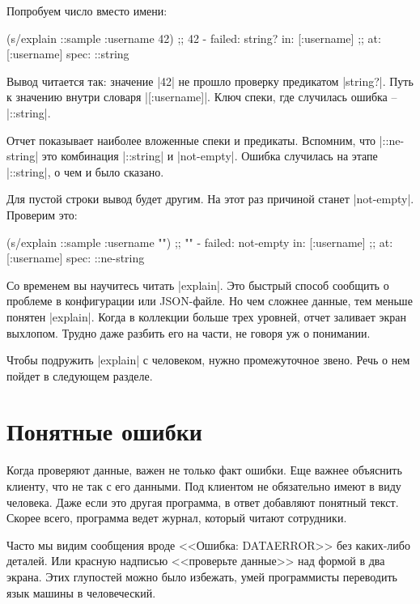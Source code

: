 Попробуем число вместо имени:

\begin{english}
  \begin{clojure}
(s/explain ::sample {:username 42})
;; 42 - failed: string? in: [:username]
;; at: [:username] spec: ::string
  \end{clojure}
\end{english}

Вывод читается так: значение \spverb|42| не прошло проверку предикатом
\spverb|string?|. Путь к значению внутри словаря \spverb|[:username]|. Ключ
спеки, где случилась ошибка -- \spverb|::string|.

Отчет показывает наиболее вложенные спеки и предикаты. Вспомним, что
\spverb|::ne-string| это комбинация \spverb|::string| и
\spverb|not-empty|. Ошибка случилась на этапе \spverb|::string|, о чем и было
сказано.

Для пустой строки вывод будет другим. На этот раз причиной станет
\spverb|not-empty|. Проверим это:

\begin{english}
  \begin{clojure}
(s/explain ::sample {:username ""})
;; "" - failed: not-empty in: [:username]
;; at: [:username] spec: ::ne-string
  \end{clojure}
\end{english}

Со временем вы научитесь читать \spverb|explain|. Это быстрый способ сообщить о
проблеме в конфигурации или JSON-файле. Но чем сложнее данные, тем меньше
понятен \spverb|explain|. Когда в коллекции больше трех уровней, отчет заливает
экран выхлопом. Трудно даже разбить его на части, не говоря уж о понимании.

Чтобы подружить \spverb|explain| с человеком, нужно промежуточное звено. Речь о
нем пойдет в следующем разделе.

\section{Понятные ошибки}

\label{spec-messages}

Когда проверяют данные, важен не только факт ошибки. Еще важнее объяснить
клиенту, что не так с его данными. Под клиентом не обязательно имеют в виду
человека. Даже если это другая программа, в ответ добавляют понятный
текст. Скорее всего, программа ведет журнал, который читают сотрудники.

Часто мы видим сообщения вроде <<Ошибка: DATAERROR>> без каких-либо деталей. Или
красную надписью <<проверьте данные>> над формой в два экрана. Этих глупостей
можно было избежать, умей программисты переводить язык машины в человеческий.

